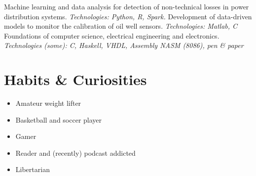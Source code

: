 \documentclass[letterpaper]{twentysecondcv} %
\begin{document}
\begin{twenty} %
	{Machine learning and data analysis for detection of non-technical losses in power 
	distribution systems. \newline
	\emph{Technologies: Python, R, Spark.}}
	{Development of data-driven models to monitor the calibration of oil well sensors. \newline
	\emph{Technologies: Matlab, C}}
	{Foundations of computer science, electrical engineering and electronics.\newline
	\emph{Technologies (some): C, Haskell, VHDL, Assembly NASM (8086), pen \& paper}}
\end{twenty}



\section{Habits \& Curiosities}

\begin{itemize}
    \item Amateur weight lifter
    \item Basketball and soccer player
    \item Gamer
    \item Reader and (recently) podcast addicted 
    \item Libertarian
\end{itemize}


% 
\end{document}
